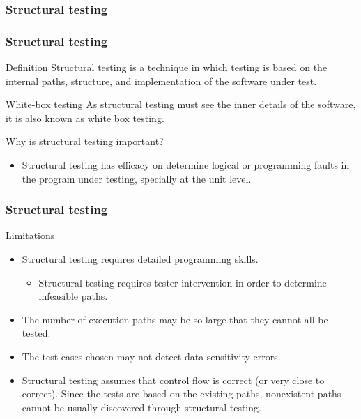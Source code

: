 \begin{frame}[parent={cmap:software-testing}, hasprev=false, hasnext=true]
\frametitle{Structural testing}
\label{cmap:structural-software-testing}
\label{cmap:structural-testing}

\end{frame}



\begin{frame}[parent={cmap:structural-software-testing},hasnext=true,hasprev=true]
\frametitle{Structural testing}
\label{concept:structural-testing}

\begin{block:concept}{Definition}
Structural testing is a technique in which testing is based on the
internal paths, structure, and implementation of the software under test.
\end{block:concept}

\begin{block:fact}{White-box testing}
As structural testing must see the inner details of the software, it is also
known as white box testing.
\end{block:fact}

\begin{block:fact}{Why is structural testing important?}
\begin{itemize}
	\item Structural testing has efficacy on determine logical or programming
	faults in the program under testing, specially at the unit level.
\end{itemize}
\end{block:fact}
\end{frame}


\begin{frame}
\frametitle{Structural testing}

\begin{block:concept}{Limitations}
\begin{itemize}
	\item Structural testing requires detailed programming skills.
	\begin{itemize}
		\item Structural testing requires tester intervention in order to
		determine infeasible paths.
	\end{itemize}

	\item The number of execution paths may be so large that they cannot all be
	tested.

	\item The test cases chosen may not detect data sensitivity errors.

	\item Structural testing assumes that control flow is correct (or very
	close to correct). Since the tests are based on the existing paths, nonexistent
	paths cannot be usually discovered through structural testing.
\end{itemize}
\end{block:concept}
\end{frame}


